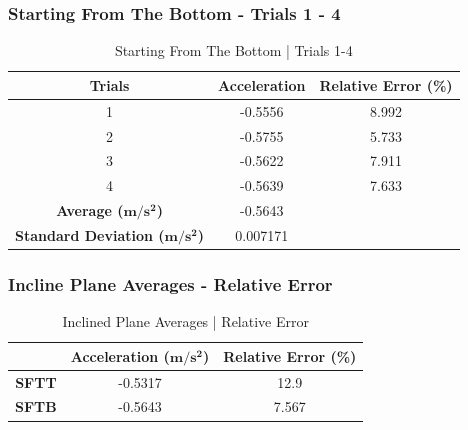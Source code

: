 
\subsubsection{Starting From The Bottom - Trials 1 - 4}

\begin{table}[H]
\centering
\begin{tabular}{@{}ccc@{}}
\toprule
\textbf{Trials} & \textbf{Acceleration} & \textbf{Relative Error (\%)} \\ \midrule
1 & -0.5556 & 8.992 \\
2 & -0.5755 & 5.733 \\
3 & -0.5622 & 7.911 \\
4 & -0.5639 & 7.633 \\ \midrule
\textbf{Average ($\boldsymbol{m/s^2}$)} & -0.5643 &  \\
\textbf{Standard Deviation ($\boldsymbol{m/s^2}$)} & 0.007171 &  \\ \bottomrule
\end{tabular}
\caption{Starting From The Bottom | Trials 1-4}
\label{tab:ip-sftb}
\end{table}

\subsubsection{Incline Plane Averages - Relative Error}
\begin{table}[H]
\centering
\begin{tabular}{@{}ccc@{}}
\toprule
 & \textbf{Acceleration ($\boldsymbol{m/s^2}$)} & \textbf{Relative Error (\%)} \\ \midrule
\textbf{SFTT} & -0.5317 & 12.9 \\
\textbf{SFTB} & -0.5643 & 7.567 \\ \bottomrule

\end{tabular}
\caption{Inclined Plane Averages | Relative Error}
\label{tab:ip-re}
\end{table}
